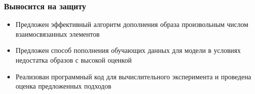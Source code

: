 \documentclass[10pt]{beamer}
\begin{document}
\begin{frame}
	\frametitle{Выносится на защиту}
		\begin{itemize}
			\item Предложен эффективный алгоритм дополнения образа произвольным числом взаимосвязанных элементов
			\item Предложен способ пополнения обучающих данных для модели в условиях недостатка образов с высокой оценкой
			\item Реализован программный код для вычислительного эксперимента и проведена оценка предложенных подходов				
		\end{itemize}
\end{frame}
\end{document}
